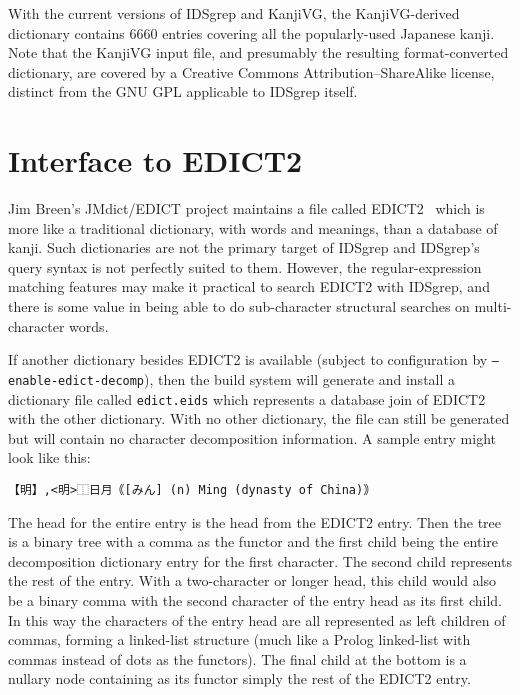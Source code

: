 \documentclass[twocolumn]{report}
\begin{document}
With the current versions of IDSgrep and KanjiVG, the KanjiVG-derived
dictionary contains 6660 entries covering all the popularly-used Japanese
kanji.  Note that the KanjiVG input file, and presumably the resulting
format-converted dictionary, are covered by a Creative Commons
Attribution--ShareAlike license, distinct from the GNU GPL applicable to
IDSgrep itself.


\section{Interface to EDICT2}

Jim Breen's JMdict/EDICT project maintains a file called
EDICT2~\cite{EDICT2} which is more like a traditional dictionary, with
words and meanings, than a database of kanji.  Such dictionaries are
not the primary target of IDSgrep and IDSgrep's query syntax is not
perfectly suited to them.  However, the regular-expression matching
features may make it practical to search EDICT2 with IDSgrep, and
there is some value in being able to do sub-character structural
searches on multi-character words.

If another dictionary besides EDICT2 is available
(subject to configuration by \texttt{--enable-edict-decomp}), then the
build system will generate and install a
dictionary file called \texttt{edict.eids} which represents a database
join of EDICT2 with the other dictionary.  With no other dictionary,
the file can still be generated but will contain no character decomposition
information.
A sample entry might look like this:
\begin{verbatim}
【明】,<明>⿰日月｟[みん] (n) Ming (dynasty of China)｠
\end{verbatim}

The head for the entire entry is the head from the EDICT2 entry.  Then the
tree is a binary tree with a comma as the functor and the first child being
the entire decomposition dictionary entry for the first character.  The
second child represents the rest of the entry.  With a two-character or
longer head, this child would also be a binary comma with the second
character of the entry head as its first child.  In this way the characters
of the entry head are all represented as left children of commas, forming a
linked-list structure (much like a Prolog linked-list with commas instead of
dots as the functors).  The final child at the bottom is a nullary node
containing as its functor simply the rest of the EDICT2 entry.
\end{document}

